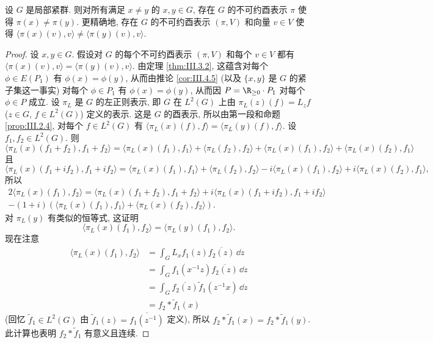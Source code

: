 \begin{theorem}
\label{thm:III.5.1}
设 $G$ 是局部紧群. 则对所有满足 $x \neq y$ 的 $x, y \in G$, 存在 $G$ 的不可约酉表示 $\pi$ 使得 $\pi(x) \neq \pi(y)$.
更精确地, 存在 $G$ 的不可约酉表示 $(\pi, V)$ 和向量 $v \in V$ 使得 $\langle \pi(x)(v), v \rangle \neq \langle \pi(y)(v), v \rangle$.
\end{theorem}

\begin{proof}
设 $x, y \in G$. 假设对 $G$ 的每个不可约酉表示 $(\pi, V)$ 和每个 $v \in V$ 都有 $\langle \pi(x)(v), v \rangle = \langle \pi(y)(v), v \rangle$. 由定理 \ref{thm:III.3.2}, 这蕴含对每个 $\phi \in E(P_1)$ 有 $\phi(x) = \phi(y)$, 从而由推论 \ref{cor:III.4.5} (以及 $\{x, y\}$ 是 $G$ 的紧子集这一事实) 对每个 $\phi \in P_1$ 有 $\phi(x) = \phi(y)$, 从而因 $P = \R_{\geq 0} \cdot P_1$ 对每个 $\phi \in P$ 成立.
设 $\pi_L$ 是 $G$ 的左正则表示, 即 $G$ 在 $L^2(G)$ 上由 $\pi_L(z)(f) = L_zf$ ($z \in G$, $f \in L^2(G)$) 定义的表示. 这是 $G$ 的酉表示, 所以由第一段和命题 \ref{prop:III.2.4}, 对每个 $f \in L^2(G)$ 有 $\langle \pi_L(x)(f), f \rangle = \langle \pi_L(y)(f), f \rangle$. 设 $f_1, f_2 \in L^2(G)$. 则
\[
\langle \pi_L(x)(f_1 + f_2), f_1 + f_2 \rangle = \langle \pi_L(x)(f_1), f_1 \rangle + \langle \pi_L(f_2), f_2 \rangle + \langle \pi_L(x)(f_1), f_2 \rangle + \langle \pi_L(x)(f_2), f_1 \rangle
\]
且
\[
\langle \pi_L(x)(f_1 + if_2), f_1 + if_2 \rangle = \langle \pi_L(x)(f_1), f_1 \rangle + \langle \pi_L(f_2), f_2 \rangle - i\langle \pi_L(x)(f_1), f_2 \rangle + i\langle \pi_L(x)(f_2), f_1 \rangle,
\]
所以
\begin{multline*}
2\langle \pi_L(x)(f_1), f_2 \rangle = \langle \pi_L(x)(f_1 + f_2), f_1 + f_2 \rangle + i\langle \pi_L(x)(f_1 + if_2), f_1 + if_2 \rangle \\
- (1 + i)(\langle \pi_L(x)(f_1), f_1 \rangle + \langle \pi_L(x)(f_2), f_2 \rangle).
\end{multline*}
对 $\pi_L(y)$ 有类似的恒等式, 这证明
\[
\langle \pi_L(x)(f_1), f_2 \rangle = \langle \pi_L(y)(f_1), f_2 \rangle.
\]
现在注意
\begin{align*}
\langle \pi_L(x)(f_1), f_2 \rangle &= \int_G L_xf_1(z)\overline{f_2(z)}\,\dd z \\
&= \int_G f_1(x^{-1}z)\overline{f_2(z)}\,\dd z \\
&= \int_G \overline{f_2(z)}\tilde{f}_1(z^{-1}x)\,\dd z \\
&= f_2 * \tilde{f}_1(x)
\end{align*}
(回忆 $\tilde{f}_1 \in L^2(G)$ 由 $\tilde{f}_1(z) = \overline{f_1(z^{-1})}$ 定义), 所以 $f_2 * \tilde{f}_1(x) = f_2 * \tilde{f}_1(y)$. 此计算也表明 $f_2 * \tilde{f}_1$ 有意义且连续.

\end{proof}
